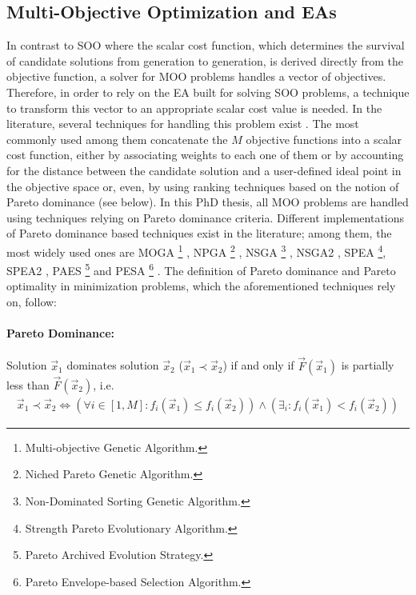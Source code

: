 \subsection{Multi-Objective Optimization and EAs}
\label{MOOini}
In contrast to SOO where the scalar cost function, which determines the survival of candidate solutions from generation to generation, is derived directly from the objective function, a solver for MOO problems handles a vector of objectives. Therefore, in order to rely on the EA built for solving SOO problems, a technique to transform this vector to an appropriate scalar cost value is needed. In the literature, several techniques for handling this problem exist \cite{CoCo99,coe02,Miett99}. The most commonly used among them concatenate the $M$ objective functions into a scalar cost function, either by associating weights to each one of them or by accounting for the distance between the candidate solution and a user-defined ideal point in the objective space or, even, by using ranking techniques based on the notion of Pareto dominance (see below). In this PhD thesis, all MOO problems are handled using techniques relying on Pareto dominance criteria. Different implementations of Pareto dominance based techniques exist in the literature; among them, the most widely used ones are MOGA \footnote{Multi-objective Genetic Algorithm.} \cite{Fon93}, NPGA \footnote{Niched Pareto Genetic Algorithm.} \cite{horn94}, NSGA \footnote{Non-Dominated Sorting Genetic Algorithm.} \cite{Sri1995}, NSGA2 \cite{Deb00a}, SPEA \footnote{Strength Pareto Evolutionary Algorithm.}\cite{ZiTh98}, SPEA2 \cite{Zitz02}, PAES \footnote{Pareto Archived Evolution Strategy.} \cite{knowles99} and PESA \footnote{Pareto Envelope-based Selection Algorithm.} \cite{corne00}. The definition of Pareto dominance and Pareto optimality in minimization problems, which the aforementioned techniques rely on, follow:

\paragraph{Pareto Dominance:} Solution $\vec{x}_1$ dominates solution $\vec{x}_2$ ($\vec{x}_1\prec\vec{x}_2$) if and only if $\vec{F}(\vec{x}_1)$ is partially less than $\vec{F}(\vec{x}_2)$, i.e.
\begin{eqnarray}
    \vec{x}_1\prec\vec{x}_2 \Leftrightarrow (\forall i \in[1,M] :  f_i(\vec{x}_1) \leq f_i(\vec{x}_2))\wedge (\exists _i : f_i(\vec{x}_1) < f_i(\vec{x}_2))
   \label{pareto_eq} 
\end{eqnarray}

